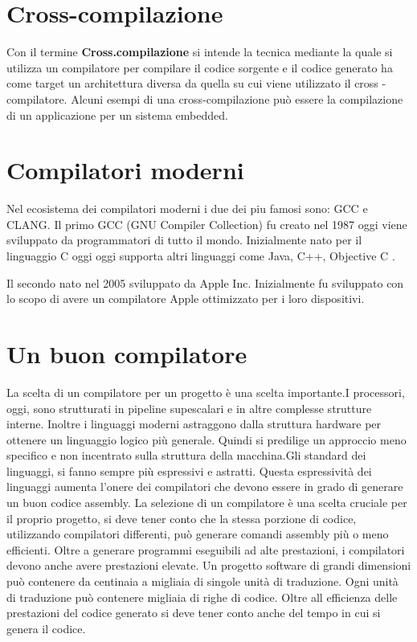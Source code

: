 \documentclass[12pt,a4paper]{report}
\begin{document}
\section{Cross-compilazione}
\label{Sec:Cross}
Con il termine \textbf{Cross.compilazione} si intende la tecnica mediante la quale si utilizza un compilatore per compilare il codice sorgente e il codice generato ha come target un architettura diversa da quella su cui viene utilizzato il cross - compilatore.  Alcuni esempi di una cross-compilazione può essere la compilazione di un applicazione per un sistema embedded. 


\section{Compilatori moderni}
Nel ecosistema dei compilatori moderni i due dei piu famosi sono: GCC e CLANG.
Il primo GCC (GNU Compiler Collection) fu creato nel 1987 oggi viene sviluppato da programmatori di tutto il mondo. Inizialmente nato per il linguaggio C oggi oggi supporta altri linguaggi come Java, C++, Objective C \cite{GCCstory}.

Il secondo nato nel 2005 sviluppato da Apple Inc.  Inizialmente fu sviluppato con lo scopo di avere un compilatore Apple ottimizzato per i loro dispositivi\cite{ClangStory}.

\section{Un buon compilatore} %
La scelta di un compilatore per un progetto è una scelta importante.I processori, oggi, sono strutturati in pipeline supescalari e in altre complesse strutture interne. Inoltre i linguaggi moderni astraggono dalla struttura hardware per ottenere un linguaggio logico più generale. Quindi si predilige un approccio meno specifico e non incentrato sulla struttura della macchina.Gli standard dei linguaggi, si fanno  sempre più espressivi e astratti.  Questa espressività dei linguaggi aumenta l'onere dei compilatori che devono essere in grado di generare un buon codice assembly. La selezione di un compilatore è una scelta cruciale per il proprio progetto, si deve tener conto che la stessa porzione di codice, utilizzando compilatori differenti, può generare comandi assembly più o meno efficienti.
Oltre a generare programmi eseguibili ad alte prestazioni, i compilatori devono anche avere prestazioni elevate. Un progetto software di grandi dimensioni  può contenere da centinaia a migliaia di singole unità di traduzione. Ogni unità di traduzione può contenere migliaia di righe di codice.  Oltre all efficienza delle prestazioni del codice generato si deve tener conto anche del tempo in cui si genera il codice.
\end{document}
